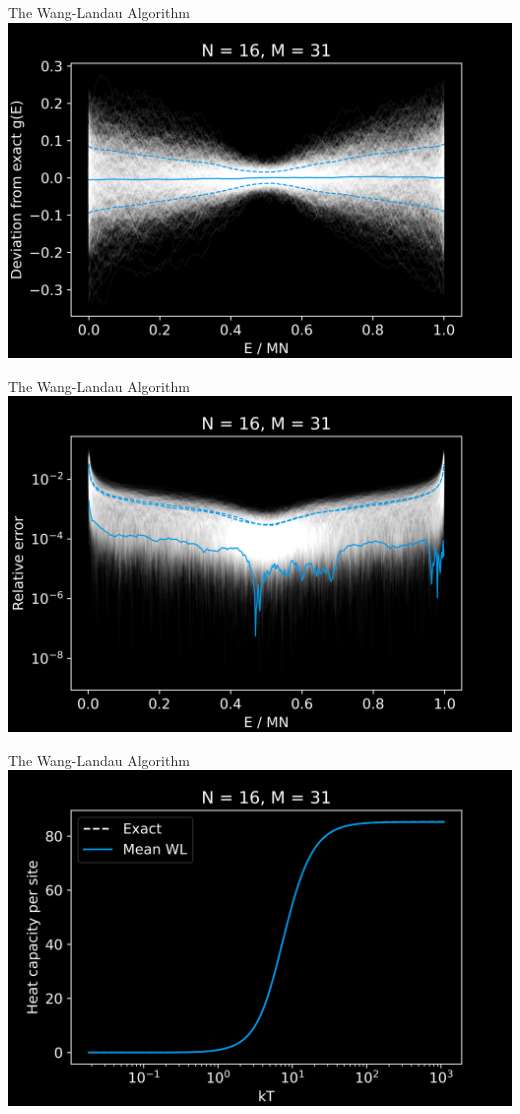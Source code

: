 \documentclass[14pt,c]{beamer}
\begin{document}
\begin{frame}{The Wang-Landau Algorithm}
  \centering
  \includegraphics[width=0.9\framewidth]{wanglandau-bw-deviation}
\end{frame}

\begin{frame}{The Wang-Landau Algorithm}
  \centering
  \includegraphics[width=0.9\framewidth]{wanglandau-bw-relerror}
\end{frame}

\begin{frame}{The Wang-Landau Algorithm}
  \centering
  \includegraphics[width=0.9\framewidth]{wanglandau-bw-C}
\end{frame}
\end{document}
